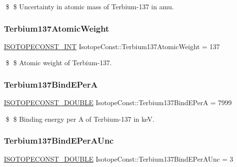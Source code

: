 \$ \$ Uncertainty in atomic mass of Terbium-\/137 in amu. \mbox{\label{group___isotope_const-_terbium-_tb137_ga8d35afdc5eeba776051843f143f01959}} 
\subsubsection{\texorpdfstring{Terbium137\+Atomic\+Weight}{Terbium137AtomicWeight}}
{\footnotesize\ttfamily \mbox{\hyperlink{group___isotope_const-_macros_ga5f18360b3e99483a35c32d789e62621c}{I\+S\+O\+T\+O\+P\+E\+C\+O\+N\+S\+T\+\_\+\+I\+NT}} Isotope\+Const\+::\+Terbium137\+Atomic\+Weight = 137}

\$ \$ Atomic weight of Terbium-\/137. \mbox{\label{group___isotope_const-_terbium-_tb137_ga1043b344478adaa32cafc9eb9e90a803}} 
\subsubsection{\texorpdfstring{Terbium137\+Bind\+E\+PerA}{Terbium137BindEPerA}}
{\footnotesize\ttfamily \mbox{\hyperlink{group___isotope_const-_macros_ga8f45a7272ce02c0b4c65c44636ed719a}{I\+S\+O\+T\+O\+P\+E\+C\+O\+N\+S\+T\+\_\+\+D\+O\+U\+B\+LE}} Isotope\+Const\+::\+Terbium137\+Bind\+E\+PerA = 7999}

\$ \$ Binding energy per A of Terbium-\/137 in keV. \mbox{\label{group___isotope_const-_terbium-_tb137_ga823a8c3c7c6926764ea13bfdad227a25}} 
\subsubsection{\texorpdfstring{Terbium137\+Bind\+E\+Per\+A\+Unc}{Terbium137BindEPerAUnc}}
{\footnotesize\ttfamily \mbox{\hyperlink{group___isotope_const-_macros_ga8f45a7272ce02c0b4c65c44636ed719a}{I\+S\+O\+T\+O\+P\+E\+C\+O\+N\+S\+T\+\_\+\+D\+O\+U\+B\+LE}} Isotope\+Const\+::\+Terbium137\+Bind\+E\+Per\+A\+Unc = 3}

